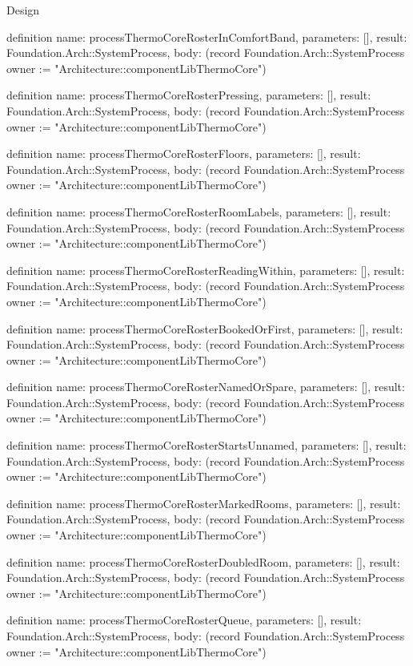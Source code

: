 \begin{lexlean}{Design}
\begin{semanticmodule}
definition{
  name: processThermoCoreRosterInComfortBand,
  parameters: [],
  result: Foundation.Arch::SystemProcess,
  body: (record Foundation.Arch::SystemProcess {owner := "Architecture::componentLibThermoCore"})
}

definition{
  name: processThermoCoreRosterPressing,
  parameters: [],
  result: Foundation.Arch::SystemProcess,
  body: (record Foundation.Arch::SystemProcess {owner := "Architecture::componentLibThermoCore"})
}

definition{
  name: processThermoCoreRosterFloors,
  parameters: [],
  result: Foundation.Arch::SystemProcess,
  body: (record Foundation.Arch::SystemProcess {owner := "Architecture::componentLibThermoCore"})
}

definition{
  name: processThermoCoreRosterRoomLabels,
  parameters: [],
  result: Foundation.Arch::SystemProcess,
  body: (record Foundation.Arch::SystemProcess {owner := "Architecture::componentLibThermoCore"})
}

definition{
  name: processThermoCoreRosterReadingWithin,
  parameters: [],
  result: Foundation.Arch::SystemProcess,
  body: (record Foundation.Arch::SystemProcess {owner := "Architecture::componentLibThermoCore"})
}

definition{
  name: processThermoCoreRosterBookedOrFirst,
  parameters: [],
  result: Foundation.Arch::SystemProcess,
  body: (record Foundation.Arch::SystemProcess {owner := "Architecture::componentLibThermoCore"})
}

definition{
  name: processThermoCoreRosterNamedOrSpare,
  parameters: [],
  result: Foundation.Arch::SystemProcess,
  body: (record Foundation.Arch::SystemProcess {owner := "Architecture::componentLibThermoCore"})
}

definition{
  name: processThermoCoreRosterStartsUnnamed,
  parameters: [],
  result: Foundation.Arch::SystemProcess,
  body: (record Foundation.Arch::SystemProcess {owner := "Architecture::componentLibThermoCore"})
}

definition{
  name: processThermoCoreRosterMarkedRooms,
  parameters: [],
  result: Foundation.Arch::SystemProcess,
  body: (record Foundation.Arch::SystemProcess {owner := "Architecture::componentLibThermoCore"})
}

definition{
  name: processThermoCoreRosterDoubledRoom,
  parameters: [],
  result: Foundation.Arch::SystemProcess,
  body: (record Foundation.Arch::SystemProcess {owner := "Architecture::componentLibThermoCore"})
}

definition{
  name: processThermoCoreRosterQueue,
  parameters: [],
  result: Foundation.Arch::SystemProcess,
  body: (record Foundation.Arch::SystemProcess {owner := "Architecture::componentLibThermoCore"})
}


\end{semanticmodule}
\end{lexlean}
